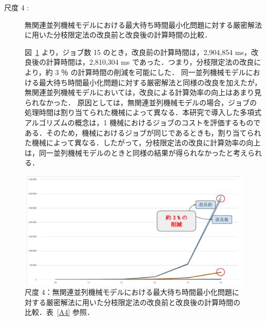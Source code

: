 \documentclass[12pt]{optlab-bachelor}
\begin{document}
\newpage
\begin{description}
  \item[尺度 4 :] 無関連並列機械モデルにおける最大待ち時間最小化問題に対する厳密解法に用いた分枝限定法の改良前と改良後の計算時間の比較．

  図~\ref{5.4} より，ジョブ数 15 のとき，改良前の計算時間は，2,904,854 ms，改良後の計算時間は，2,810,304 ms であった．つまり，分枝限定法の改良により，約 3 ％ の計算時間の削減を可能にした．
  同一並列機械モデルにおける最大待ち時間最小化問題に対する厳密解法と同様の改良を加えたが，無関連並列機械モデルにおいては，改良による計算効率の向上はあまり見られなかった．
  原因としては，無関連並列機械モデルの場合，ジョブの処理時間は割り当てられた機械によって異なる．本研究で導入した多項式アルゴリズムの概念は，1 機械におけるジョブのコストを評価するものである．そのため，機械におけるジョブが同じであるときも，割り当てられた機械によって異なる．したがって，分枝限定法の改良に計算効率の向上は，同一並列機械モデルのときと同様の結果が得られなかったと考えられる．
\end{description}
\begin{figure}[ht]
  \centering
  \includegraphics[width = 16cm]{figure/BandBTimeUn.pdf}
  \caption{尺度 4：無関連並列機械モデルにおける最大待ち時間最小化問題に対する厳密解法に用いた分枝限定法の改良前と改良後の計算時間の比較．表~\ref{A4} 参照．}
  \label{5.4}
\end{figure}
\end{document}
